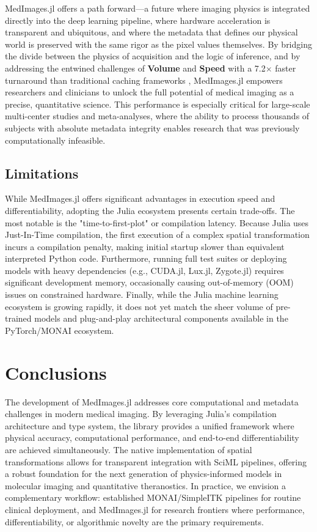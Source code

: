 \documentclass[10pt,letterpaper]{article}
\begin{document}
MedImages.jl offers a path forward---a future where imaging physics is integrated directly into the deep learning pipeline, where hardware acceleration is transparent and ubiquitous, and where the metadata that defines our physical world is preserved with the same rigor as the pixel values themselves. By bridging the divide between the physics of acquisition and the logic of inference, and by addressing the entwined challenges of \textbf{Volume} and \textbf{Speed} with a 7.2$\times$ faster turnaround than traditional caching frameworks \cite{Shi_2023}, MedImages.jl empowers researchers and clinicians to unlock the full potential of medical imaging as a precise, quantitative science. This performance is especially critical for large-scale multi-center studies and meta-analyses, where the ability to process thousands of subjects with absolute metadata integrity enables research that was previously computationally infeasible.


\subsection*{Limitations}
While MedImages.jl offers significant advantages in execution speed and differentiability, adopting the Julia ecosystem presents certain trade-offs. The most notable is the "time-to-first-plot" or compilation latency. Because Julia uses Just-In-Time compilation, the first execution of a complex spatial transformation incurs a compilation penalty, making initial startup slower than equivalent interpreted Python code. Furthermore, running full test suites or deploying models with heavy dependencies (e.g., CUDA.jl, Lux.jl, Zygote.jl) requires significant development memory, occasionally causing out-of-memory (OOM) issues on constrained hardware. Finally, while the Julia machine learning ecosystem is growing rapidly, it does not yet match the sheer volume of pre-trained models and plug-and-play architectural components available in the PyTorch/MONAI ecosystem.

\section{Conclusions}
The development of MedImages.jl addresses core computational and metadata challenges in modern medical imaging. By leveraging Julia's compilation architecture and type system, the library provides a unified framework where physical accuracy, computational performance, and end-to-end differentiability are achieved simultaneously. The native implementation of spatial transformations allows for transparent integration with SciML pipelines, offering a robust foundation for the next generation of physics-informed models in molecular imaging and quantitative theranostics.
In practice, we envision a complementary workflow: established MONAI/SimpleITK pipelines for routine clinical deployment, and MedImages.jl for research frontiers where performance, differentiability, or algorithmic novelty are the primary requirements.
\end{document}
